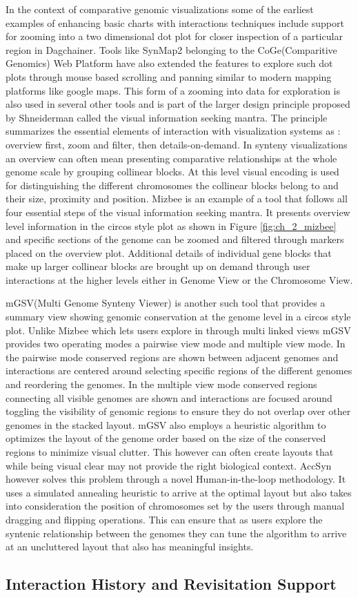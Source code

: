 In the context of comparative genomic visualizations some of the earliest examples of enhancing basic charts with interactions techniques include support for zooming into a two dimensional dot plot for closer inspection of a particular region in Dagchainer\cite{haas2004dagchainer}. Tools like SynMap2\cite{haug2017synmap2} belonging to the CoGe(Comparitive Genomics)\cite{coge} Web Platform have also extended the features to explore such dot plots through mouse based scrolling and panning similar to modern mapping platforms like google maps. This form of a zooming into data for exploration is also used in several other tools and is part of the larger design principle proposed by Shneiderman\cite{Shneiderman96theeyes} called the visual information seeking mantra. The principle summarizes the essential elements of interaction with visualization systems as : overview first, zoom and filter, then details-on-demand. In synteny visualizations an overview can often mean presenting comparative relationships at the whole genome scale by grouping collinear blocks. At this level visual encoding is used for distinguishing the different chromosomes the collinear blocks belong to and their size, proximity and position. Mizbee is an example of a tool that follows all four essential steps of the visual information seeking mantra\cite{Meyer2009}. It presents overview level information in the circos style plot as shown in Figure \ref{fig:ch_2_mizbee} and specific sections of the genome can be zoomed and filtered through markers placed on the overview plot. Additional details of individual gene blocks that make up larger collinear blocks are brought up on demand through user interactions at the higher levels either in Genome View or the  Chromosome View. 

mGSV(Multi Genome Synteny Viewer) is another such tool that provides a summary view showing genomic conservation at the genome level in a circos style plot\cite{revanna2011gsv}. Unlike Mizbee which lets users explore in through multi linked views mGSV provides two operating modes a pairwise view mode and multiple view mode. In the pairwise mode conserved regions are shown between adjacent genomes and interactions are centered around selecting specific regions of the different genomes and reordering the genomes. In the multiple view mode conserved regions connecting all visible genomes are shown and interactions are focused around toggling the visibility of genomic regions to ensure they do not overlap over other genomes in the stacked layout. mGSV also employs a heuristic algorithm to optimizes the layout of the genome order based on the size of the conserved regions to minimize visual clutter. This however can often create layouts that while being visual clear may not provide the right biological context. AccSyn however solves this problem through a novel Human-in-the-loop methodology\cite{accusyn}. It uses a simulated annealing heuristic to arrive at the optimal layout but also takes into consideration the position of chromosomes set by the users through manual dragging and flipping operations. This can ensure that as users explore the syntenic relationship between the genomes they can tune the algorithm to arrive at an uncluttered layout that also has meaningful insights.

\subsection{Interaction History and Revisitation Support}

